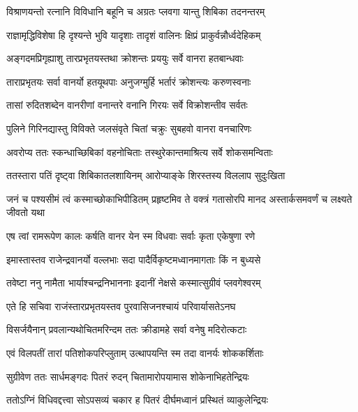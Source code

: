 \twolineshloka
{विश्राणयन्तो रत्नानि विविधानि बहूनि च}
{अग्रतः प्लवगा यान्तु शिबिका तदनन्तरम्} %

\twolineshloka
{राज्ञामृद्धिविशेषा हि दृश्यन्ते भुवि यादृशाः}
{तादृशं वालिनः क्षिप्रं प्राकुर्वन्नौर्ध्वदेहिकम्} %

\twolineshloka
{अङ्गदमप्रिगृह्याशु तारप्रभृतयस्तथा}
{क्रोशन्तः प्रययुः सर्वे वानरा हतबान्धवाः} %

\twolineshloka
{ताराप्रभृतयः सर्वा वानर्यो हतयूथपाः}
{अनुजग्मुर्हि भर्तारं क्रोशन्त्यः करुणस्वनाः} %

\twolineshloka
{तासां रुदितशब्देन वानरीणां वनान्तरे}
{वनानि गिरयः सर्वे विक्रोशन्तीव सर्वतः} %

\twolineshloka
{पुलिने गिरिनद्यास्तु विविक्ते जलसंवृते}
{चितां चक्रुः सुबहवो वानरा वनचारिणः} %

\twolineshloka
{अवरोप्य ततः स्कन्धाच्छिबिकां वहनोचिताः}
{तस्थुरेकान्तमाश्रित्य सर्वे शोकसमन्विताः} %

\twolineshloka
{ततस्तारा पतिं दृष्ट्वा शिबिकातलशायिनम्}
{आरोप्याङ्के शिरस्तस्य विललाप सुदुःखिता} %

\threelineshloka
{जनं च पश्यसीमं त्वं कस्माच्छोकाभिपीडितम्}
{प्रहृष्टमिव ते वक्त्रं गतासोरपि मानद}
{अस्तार्कसमवर्णं च लक्ष्यते जीवतो यथा} %

\twolineshloka
{एष त्वां रामरूपेण कालः कर्षति वानर}
{येन स्म विधवाः सर्वाः कृता एकेषुणा रणे} %

\twolineshloka
{इमास्तास्तव राजेन्द्रवानर्यो वल्लभाः सदा}
{पादैर्विकृष्टमध्वानमागताः किं न बुध्यसे} %

\twolineshloka
{तवेष्टा ननु नामैता भार्याश्चन्द्रनिभाननाः}
{इदानीं नेक्षसे कस्मात्सुग्रीवं प्लवगेश्वरम्} %

\twolineshloka
{एते हि सचिवा राजंस्तारप्रभृतयस्तव}
{पुरवासिजनश्चायं परिवार्यासतेऽनघ} %

\twolineshloka
{विसर्जयैनान् प्रवलान्यथोचितमरिन्दम}
{ततः क्रीडामहे सर्वा वनेषु मदिरोत्कटाः} %

\twolineshloka
{एवं विलपतीं तारां पतिशोकपरिप्लुताम्}
{उत्थापयन्ति स्म तदा वानर्यः शोककर्शिताः} %

\twolineshloka
{सुग्रीवेण ततः सार्धमङ्गदः पितरं रुदन्}
{चितामारोपयामास शोकेनाभिहतेन्द्रियः} %

\twolineshloka
{ततोऽग्निं विधिवद्दत्त्वा सोऽपसव्यं चकार ह}
{पितरं दीर्घमध्वानं प्रस्थितं व्याकुलेन्द्रियः} %


